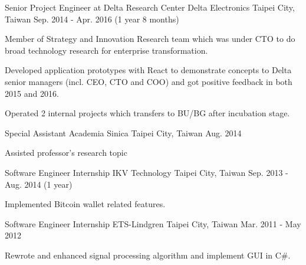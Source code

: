 \begin{cventries}
  \cventry
    {Senior Project Engineer at Delta Research Center} %
    {Delta Electronics} %
    {Taipei City, Taiwan} %
    {Sep. 2014 - Apr. 2016 (1 year 8 months)} %
    {
      \begin{cvitems} %
        \item {Member of Strategy and Innovation Research team which was under CTO to do broad technology research for enterprise transformation.}
        \item {Developed application prototypes with React to demonstrate concepts to Delta senior managers (incl. CEO, CTO and COO) and got positive feedback in both 2015 and 2016.}
        \item {Operated 2 internal projects which transfers to BU/BG after incubation stage. }
      \end{cvitems}
    }

  \cventry
    {Special Assistant} %
    {Academia Sinica} %
    {Taipei City, Taiwan} %
    {Aug. 2014} %
    {
      \begin{cvitems} %
        \item {Assisted professor's research topic}
      \end{cvitems}
    }

  \cventry
    {Software Engineer Internship} %
    {IKV Technology} %
    {Taipei City, Taiwan} %
    {Sep. 2013 - Aug. 2014 (1 year)} %
    {
      \begin{cvitems} %
        \item {Implemented Bitcoin wallet related features.}
      \end{cvitems}
    }

  \cventry
    {Software Engineer Internship} %
    {ETS-Lindgren} %
    {Taipei City, Taiwan} %
    {Mar. 2011 - May 2012} %
    {
      \begin{cvitems} %
        \item {Rewrote and enhanced signal processing algorithm and implement GUI in C\#.}
      \end{cvitems}
    }
\end{cventries}
